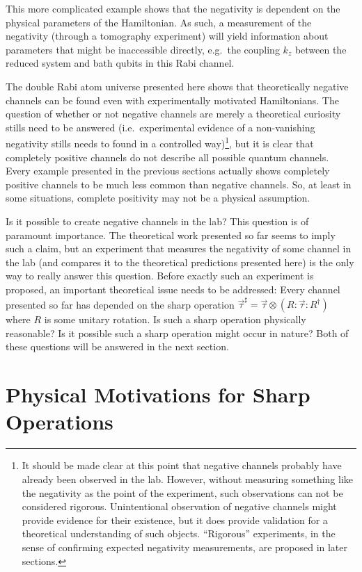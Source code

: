 This more complicated example shows that the negativity is dependent on the physical parameters of the Hamiltonian.  As such, a measurement of the negativity (through a tomography experiment) will yield information about parameters that might be inaccessible directly, e.g.\ the coupling $k_z$ between the reduced system and bath qubits in this Rabi channel.
 
The double Rabi atom universe presented here shows that theoretically negative channels can be found even with experimentally motivated Hamiltonians.  The question of whether or not negative channels are merely a theoretical curiosity stills need to be answered (i.e.\ experimental evidence of a non-vanishing negativity stills needs to found in a controlled way)\footnote{It should be made clear at this point that negative channels probably have already been observed in the lab.  However, without measuring something like the negativity as the point of the experiment, such observations can not be considered rigorous.  Unintentional observation of negative channels might provide evidence for their existence, but it does provide validation for a theoretical understanding of such objects.  ``Rigorous'' experiments, in the sense of confirming expected negativity measurements, are proposed in later sections.}, but it is clear that completely positive channels do not describe all possible quantum channels.  Every example presented in the previous sections actually shows completely positive channels to be much less common than negative channels.  So, at least in some situations, complete positivity may not be a physical assumption.    

Is it possible to create negative channels in the lab?  This question is of paramount importance.  The theoretical work presented so far seems to imply such a claim, but an experiment that measures the negativity of some channel in the lab (and compares it to the theoretical predictions presented here) is the only way to really answer this question.  Before exactly such an experiment is proposed, an important theoretical issue needs to be addressed:  Every channel presented so far has depended on the sharp operation $\vec{\tau}^\sharp=\vec{\tau}\otimes\left(R:\vec{\tau}:R^\dagger\right)$ where $R$ is some unitary rotation.  Is such a sharp operation physically reasonable?  Is it possible such a sharp operation might occur in nature?  Both of these questions will be answered in the next section.


\section{Physical Motivations for Sharp Operations}
\label{sec:sharp}

